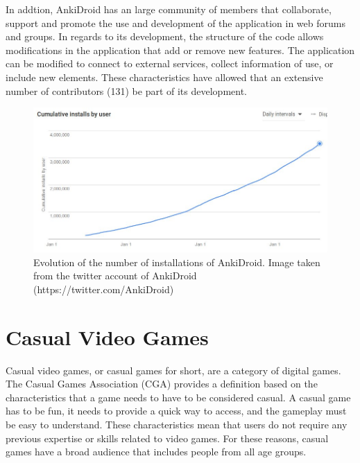 In addtion, AnkiDroid has an large community of members that collaborate, support and promote the use and development of the application in web forums and groups. In regards to its development, the structure of the code allows modifications in the application that add or remove new features. The application can be modified to connect to external services, collect information of use, or include new elements. These characteristics have allowed that an extensive number of contributors (131) be part of its development.

\begin{figure}[htb]
    \vskip 5mm
        \begin{center}
            \includegraphics[scale=0.4]{./Figures/anki_progress.jpg}
            \caption{Evolution of the number of installations of AnkiDroid. Image taken from the twitter account of AnkiDroid (https://twitter.com/AnkiDroid)}
            \label{fig:anki-evolution}
        \end{center}
    \vskip -5mm
\end{figure}


\section{Casual Video Games}
Casual video games, or casual games for short, are a category of digital games. The Casual Games Association (CGA) provides a definition based on the characteristics that a game needs to have to be considered casual. A casual game has to be fun, it needs to provide a quick way to access, and the gameplay must be easy to understand. These characteristics mean that users do not require any previous expertise or skills related to video games. For these reasons, casual games have a broad audience that includes people from all age groups.

